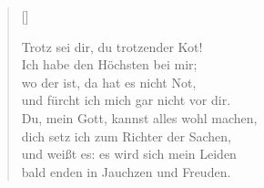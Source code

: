 \begin{center}
\settowidth{\versewidth}{Der, vor dem die Welt erschrickt,}
\begin{verse}[\versewidth]


 Trotz sei dir, du trotzender Kot!\\
Ich habe den Höchsten bei mir;\\
wo der ist, da hat es nicht Not,\\
und fürcht ich mich gar nicht vor dir.\\
Du, mein Gott, kannst alles wohl machen,\\
dich setz ich zum Richter der Sachen,\\
und weißt es: es wird sich mein Leiden\\
bald enden in Jauchzen und Freuden.

  
\end{verse}
\end{center}

